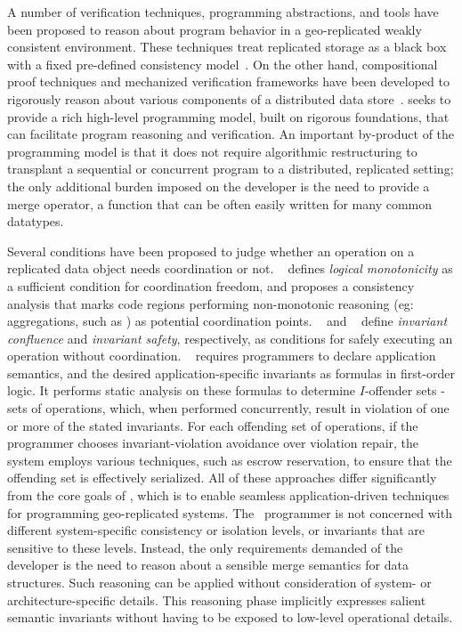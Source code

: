 A number of verification techniques, programming abstractions, and
tools have been proposed to reason about program behavior in a
geo-replicated weakly consistent environment.  These techniques treat
replicated storage as a black box with a fixed pre-defined consistency
model~\cite{bailis-vldb, alvaro-calm, gotsman-popl16,redblue-atc,
  redblue-osdi, ecinec}.  On the other hand, compositional proof
techniques and mechanized verification frameworks have been developed
to rigorously reason about various components of a distributed data
store~\cite{verdi,lbc16}. \name seeks to provide a rich high-level
programming model, built on rigorous foundations, that can facilitate
program reasoning and verification.  An important by-product of the
programming model is that it does not require algorithmic
restructuring to transplant a sequential or concurrent program to a
distributed, replicated setting; the only additional burden imposed on
the developer is the need to provide a merge operator, a function that
can be often easily written for many common datatypes.

Several conditions have been proposed to judge whether an operation on
a replicated data object needs coordination or not. ~\cite{Calm}
defines \emph{logical monotonicity} as a sufficient condition for
coordination freedom, and proposes a consistency analysis that marks
code regions performing non-monotonic reasoning (eg: aggregations,
such as ) as potential coordination
points. ~\cite{IConfluence} and ~\cite{Sieve} define \emph{invariant
  confluence} and \emph{invariant safety}, respectively, as conditions
for safely executing an operation without coordination.
~\cite{indigo} requires programmers to declare application semantics,
and the desired application-specific invariants as formulas in
first-order logic. It performs static analysis on these formulas to
determine $I$-offender sets - sets of operations, which, when
performed concurrently, result in violation of one or more of the
stated invariants. For each offending set of operations, if the
programmer chooses invariant-violation avoidance over violation
repair, the system employs various techniques, such as escrow
reservation, to ensure that the offending set is effectively
serialized.  All of these approaches differ significantly from the
core goals of \name, which is to enable seamless application-driven
techniques for programming geo-replicated systems.  The
\name\ programmer is not concerned with different system-specific
consistency or isolation levels, or invariants that are sensitive to
these levels.  Instead, the only requirements demanded of the
developer is the need to reason about a sensible merge semantics for
data structures.  Such reasoning can be applied without consideration
of system- or architecture-specific details.  This reasoning phase
implicitly expresses salient semantic invariants without having to be
exposed to low-level operational details.
